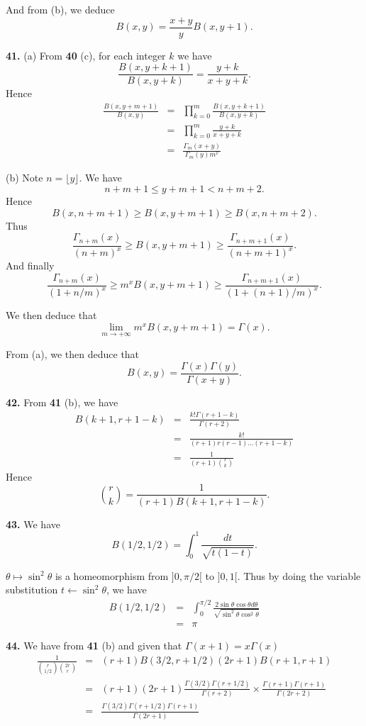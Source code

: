 \documentclass[a4paper,12pt]{article}
\newcommand{\newpar}[1]{\bigskip \noindent \textbf{#1.}}
\newcommand{\subpar}[1]{\medskip \noindent (#1)}
\newcommand{\la}{\leftarrow}
\begin{document}
And from (b), we deduce
\[ B(x, y) = \frac{x+y}{y} B(x, y+1).\]

\newpar{41} \subpar{a} From \textbf{40} (c), for each integer $k$ we have
\[ \frac{B(x, y + k + 1)}{B(x, y+k)} = \frac{y + k}{x+y+k}.\]
Hence
\begin{eqnarray*}
  \frac{B(x, y+m+1)}{B(x, y)} &=& \prod_{k=0}^m \frac{B(x,
    y+k+1)}{B(x, y+k)} \\
  &=& \prod_{k=0}^m \frac{y+k}{x+y+k} \\
  &=& \frac{\Gamma_m(x+y)}{\Gamma_m(y)m^x}
\end{eqnarray*}

\subpar{b} Note $n = \lfloor y\rfloor$.  We have
\[ n + m + 1 \le y + m + 1 < n+m+2.\]
Hence
\[ B(x, n+m+1) \ge B(x, y+m+1) \ge B(x, n+m+2).\]
Thus
\[ \frac{\Gamma_{n+m}(x)}{(n+m)^x} \ge B(x, y+m+1) \ge
\frac{\Gamma_{n+m+1}(x)}{(n+m+1)^x}.\]
And finally
\[ \frac{\Gamma_{n+m}(x)}{(1+n/m)^x} \ge m^x B(x, y+m+1) \ge
\frac{\Gamma_{n+m+1}(x)}{(1+(n+1)/m)^x}.\]

We then deduce that
\[ \lim_{m \to +\infty} m^x B(x, y+m+1) = \Gamma(x).\]

From (a), we then deduce that
\[ B(x, y) = \frac{\Gamma(x) \Gamma(y)}{\Gamma(x+y)}.\]

\newpar{42}  From \textbf{41} (b), we have
\begin{eqnarray*}
  B(k+1, r+1-k) &=& \frac{k!\Gamma(r+1-k)}{\Gamma(r+2)} \\
  &=& \frac{k!}{(r+1)r(r-1) \ldots (r+1-k)} \\
  &=& \frac{1}{(r+1){r \choose k}}
\end{eqnarray*}
Hence
\[ {r \choose k} = \frac{1}{(r+1)B(k+1, r+1-k)}.\]

\newpar{43} We have
\[ B(1/2, 1/2) = \int_0^1 \frac{dt}{\sqrt{t(1-t)}}.\]

$\theta \mapsto \sin^2\theta$ is a homeomorphism from $]0, \pi/2[$ to
$]0, 1[$. Thus by doing the variable substitution $t \la
\sin^2\theta$, we have
\begin{eqnarray*}
  B(1/2, 1/2) &=& \int_0^{\pi/2} \frac{2 \sin\theta \cos\theta
    d\theta}{\sqrt{\sin^2\theta \cos^2\theta}} \\
  &=& \pi
\end{eqnarray*}

\newpar{44} We have from \textbf{41} (b) and given that $\Gamma(x+1) =
x\Gamma(x)$
\begin{eqnarray*}
  \frac{1}{{r \choose 1/2} {2r \choose r}} &=&
  (r+1)B(3/2,r+1/2)(2r+1)B(r+1, r+1) \\
  &=& (r+1)(2r+1)
  \frac{\Gamma(3/2)\Gamma(r+1/2)}{\Gamma(r+2)}\times\frac{\Gamma(r+1)\Gamma(r+1)}{\Gamma(2r+2)}
  \\ &=& \frac{\Gamma(3/2)\Gamma(r+1/2) \Gamma(r+1)}{\Gamma(2r+1)} \\
\end{eqnarray*}
\end{document}
